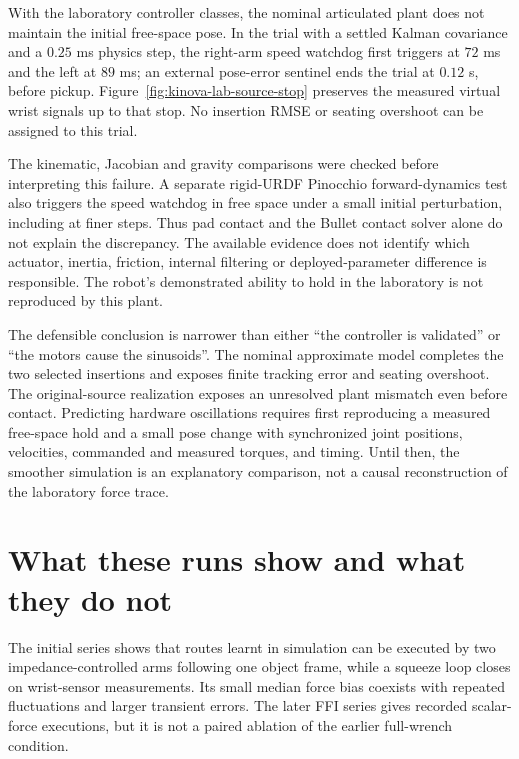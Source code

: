 With the laboratory controller classes, the nominal articulated plant does not maintain the initial free-space pose. In the trial with a settled Kalman covariance and a $0.25$ ms physics step, the right-arm speed watchdog first triggers at $72$ ms and the left at $89$ ms; an external pose-error sentinel ends the trial at $0.12$ s, before pickup. Figure~\ref{fig:kinova-lab-source-stop} preserves the measured virtual wrist signals up to that stop. No insertion RMSE or seating overshoot can be assigned to this trial.


The kinematic, Jacobian and gravity comparisons were checked before interpreting this failure. A separate rigid-URDF Pinocchio forward-dynamics test also triggers the speed watchdog in free space under a small initial perturbation, including at finer steps. Thus pad contact and the Bullet contact solver alone do not explain the discrepancy. The available evidence does not identify which actuator, inertia, friction, internal filtering or deployed-parameter difference is responsible. The robot's demonstrated ability to hold in the laboratory is not reproduced by this plant.

The defensible conclusion is narrower than either ``the controller is validated'' or ``the motors cause the sinusoids''. The nominal approximate model completes the two selected insertions and exposes finite tracking error and seating overshoot. The original-source realization exposes an unresolved plant mismatch even before contact. Predicting hardware oscillations requires first reproducing a measured free-space hold and a small pose change with synchronized joint positions, velocities, commanded and measured torques, and timing. Until then, the smoother simulation is an explanatory comparison, not a causal reconstruction of the laboratory force trace.


\section{What these runs show and what they do not}

The initial series shows that routes learnt in simulation can be executed by two impedance-controlled arms following one object frame, while a squeeze loop closes on wrist-sensor measurements. Its small median force bias coexists with repeated fluctuations and larger transient errors. The later FFI series gives recorded scalar-force executions, but it is not a paired ablation of the earlier full-wrench condition.

